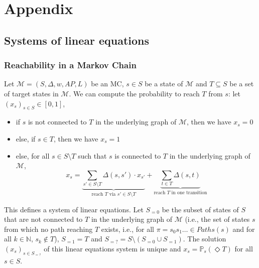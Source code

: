 \chapter*{Appendix}
\renewcommand{\thechapter}{\Alph{chapter}}
\setcounter{chapter}{1}

\section{Systems of linear equations}
\subsection{Reachability in a Markov Chain}\label{app-reach}
Let $\mathcal{M} = (S, \Delta, w, AP, L)$ be an MC, $s \in S$ be a state of $\mathcal{M}$ and $T \subseteq S$ be a set of target states in $\mathcal{M}$.
We can compute the probability to reach $T$ from $s$:
let $(x_s)_{s \in S} \in [0, 1]$,
\begin{itemize}
	\item if $s$ is not connected to $T$ in the underlying graph of $\mathcal{M}$, then we have $x_s = 0$
	\item else, if $s \in T$, then we have $x_s = 1$
	\item else, for all $s \in S \setminus T$  such that $s$ is connected to $T$ in the underlying graph of $\mathcal{M}$,
		\[
      x_s = \underbrace{\sum_{s' \in S \setminus T} \Delta(s, s') \cdot x_{s'}}_{\text{reach $T$ via $s' \in S \setminus T$}} + \underbrace{\sum_{t \in T} \Delta(s, t)}_{\text{reach $T$ in one transition}}
    \]
\end{itemize}
This defines a system of linear equations.
Let $S_{=0}$ be the subset of states of $S$ that are not connected to $T$ in the underlying graph of $\mathcal{M}$ (i.e., the set of states $s$ from which no path reaching $T$ exists, i.e., for all $\pi = s_0s_1\dots \in Paths(s)$ and for all $k \in \mathbb{N}$, $s_k \not\in T$), $S_{=1} = T$ and $S_{=?} = S \setminus (S_{=0} \cup S_{=1})$.
The solution $(x_s)_{s \in S_{=?}}$ of this linear equations system is unique and $x_s = \mathbb{P}_s(\Diamond T)$ for all $s \in S$.

